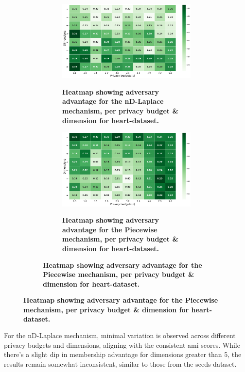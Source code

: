 \begin{figure}[H]
  \centering
  \begin{subfigure}[b]{0.75\textwidth}
    \begin{subfigure}[c]{1\textwidth}
      \caption{\textbf{Heatmap showing adversary advantage for the nD-Laplace mechanism, per privacy budget \& dimension for heart-dataset.}}
      \includegraphics[width=1\textwidth]{Results/nd-laplace/nd-Laplace/heart-dataset/attack_adv.png}
      \label{fig:privacy_heart-dataset_adversial_advantage_kd-laplace}
    \end{subfigure}
    \vfill %

    \begin{subfigure}[c]{1\textwidth}
      \caption{\textbf{Heatmap showing adversary advantage for the Piecewise mechanism, per privacy budget \& dimension for heart-dataset.}}
      \includegraphics[width=1\textwidth]{Results/nd-laplace/piecewise/heart-dataset/attack_adv.png}
      \label{fig:privacy_heart-dataset_adversial_advantage_piecewise}
    \end{subfigure}
  \end{subfigure}
\end{figure}
For the nD-Laplace mechanism, minimal variation is observed across different privacy budgets and dimensions, aligning with the consistent \gls{ami} scores. While there's a slight dip in membership advantage for dimensions greater than 5, the results remain somewhat inconsistent, similar to those from the seeds-dataset.

